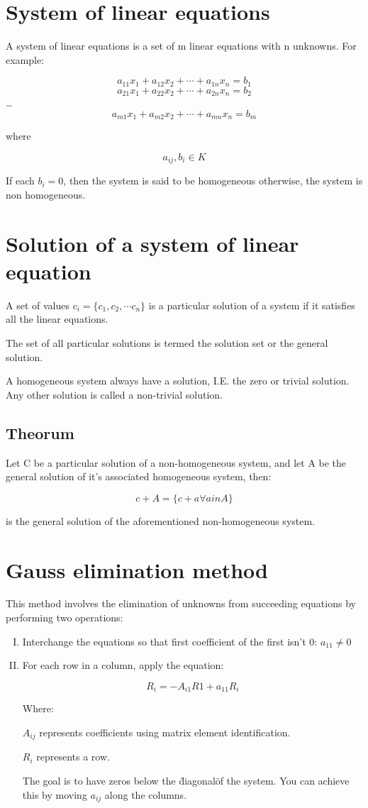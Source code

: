 \documentclass{book}
\begin{document}
\section{System of linear equations}

A system of linear equations is a set of m linear equations with n unknowns. For example:

\[a_{11} x_1 + a_{12} x_2 + \cdots + a_{1n} x_n = b_1\]
\[a_{21} x_1 + a_{22} x_2 + \cdots + a_{2n} x_n = b_2\]
\ldots
\[a_{m1} x_1 + a_{m2} x_2 + \cdots + a_{mn} x_n = b_m\]

where

\[a_{ij}, b_i \in K\]

If each \(b_i = 0\), then the system is said to be homogeneous otherwise, the system is non homogeneous.

\section{Solution of a system of linear equation}
A set of values \(c_i = \{c_1, c_2, \cdots c_n\}\) is a particular solution of a system if it satisfies all the linear equations.

The set of all particular solutions is termed the solution set or the general solution.

A homogeneous system always have a solution, I.E. the zero or trivial solution. Any other solution is called a non-trivial solution.

\subsection{Theorum}

Let C be a particular solution of a non-homogeneous system, and let A be the general solution of it's associated homogeneous system, then:

\[c + A = \{c + a \forall a in A\}\]

is the general solution of the aforementioned non-homogeneous system.

\section{Gauss elimination method}

This method involves the elimination of unknowns from succeeding equations by performing two operations:

\begin{enumerate}[I.]
	\item Interchange the equations so that first coefficient of the first isn't 0: \(a_{11} \ne 0\)
	\item For each row in a column, apply the equation:

		\[R_i = -A_{i1}R1 + a_{11}R_i\]

		Where:

		\(A_{ij}\) represents coefficients using matrix element identification.

		\(R_i\) represents a row.

		The goal is to have zeros below the \"diagonal\" of the system. You can achieve this by moving \(a_{ij}\) along the columns.
\end{enumerate}
\end{document}
